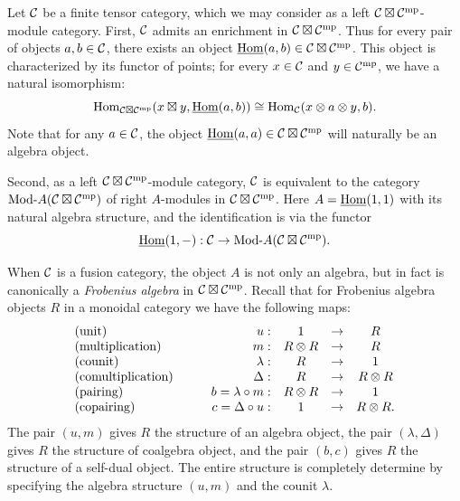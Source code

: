 \documentclass{amsart}
\begin{document}
Let $\mathcal C$ be a finite tensor category, which we may consider as a left $\mathcal C \boxtimes \mathcal C^{\mathrm{mp}}$-module category. First, $\mathcal C$ admits an enrichment in $\mathcal C \boxtimes \mathcal C^{\mathrm{mp}}$. Thus for every pair of objects $a, b \in \mathcal C$, there exists an object $\operatorname{\underline{Hom}}(a,b) \in \mathcal C \boxtimes \mathcal C^{\mathrm{mp}}$. This object is characterized by its functor of points; for every $x \in \mathcal C$ and $y \in \mathcal C^{\mathrm{mp}}$, we have a natural isomorphism:
\begin{equation*}
	\operatorname{Hom}_{\mathcal C \boxtimes \mathcal C^{\mathrm{mp}}}( x \boxtimes y , \operatorname{\underline{Hom}}(a,b)) \cong \operatorname{Hom}_{\mathcal C}(x \otimes a \otimes y, b).
\end{equation*}
Note that for any $a \in \mathcal C$, the object $\operatorname{\underline{Hom}}(a,a) \in \mathcal C \boxtimes \mathcal C^{\mathrm{mp}}$ will naturally be an algebra object. 

Second, as a left $\mathcal C \boxtimes \mathcal C^{\mathrm{mp}}$-module category, $\mathcal C$ is equivalent to the category $\Mod{}{A}(\cC \boxtimes \cC^\mp)$ of right $A$-modules in $\mathcal C \boxtimes \mathcal C^{\mathrm{mp}}$. Here $A = \operatorname{\underline{Hom}}(1,1)$ with its natural algebra structure, and the identification is via the functor 
\begin{equation*}
	\IHom(1, -): \cC \to \Mod{}{A}(\cC \boxtimes \cC^\mp).
\end{equation*}

When $\mathcal C$ is a fusion category, the object $A$ is not only an algebra, but in fact is canonically a {\em Frobenius algebra} in $\mathcal C \boxtimes \mathcal C^{\mathrm{mp}}$. Recall that for Frobenius algebra objects $R$ in a monoidal category we have the following maps:
\begin{equation*}
	\begin{array}{l c  r c c c}
		\textrm{(unit)} & \quad & u: & 1 & \to & R \\
		\textrm{(multiplication)} && m: & R \otimes R & \to & R \\
		\textrm{(counit)} && \lambda: & R &\to &1 \\
		\textrm{(comultiplication)} && \Delta: & R &\to& R \otimes R \\
		\textrm{(pairing)} && b = \lambda \circ m: & R \otimes R& \to& 1 \\
		\textrm{(copairing)} && c = \Delta \circ u: & 1&\to&  R \otimes R.
	\end{array}
\end{equation*}
The pair $(u,m)$ gives $R$ the structure of an algebra object, the pair $(\lambda, \Delta)$ gives $R$ the structure of coalgebra object, and the pair $(b,c)$ gives $R$ the structure of a self-dual object. The entire structure is completely determine by specifying the algebra structure $(u,m)$ and the counit $\lambda$.
\end{document}
